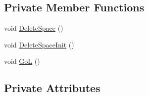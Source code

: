 \subsection*{Private Member Functions}
\begin{DoxyCompactItemize}
\item 
void \hyperlink{classCCellularAutomata_a41cd53509e1fa773fd6a5ea08b08a2c1}{DeleteSpace} ()
\item 
void \hyperlink{classCCellularAutomata_a8b1286ff6ab0aa60b2e407cb09389cd8}{DeleteSpaceInit} ()
\item 
void \hyperlink{classCCellularAutomata_a02b47aed358ce08d72171ef555bbe2d3}{GoL} ()
\end{DoxyCompactItemize}
\subsection*{Private Attributes}
